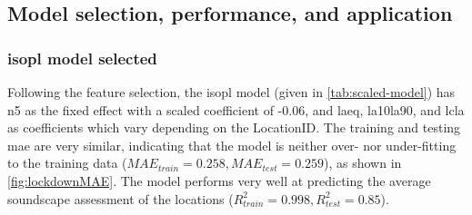  \subsection{Model selection, performance, and application}

\subsubsection{\gls{isopl} model selected}
   Following the feature selection, the \gls{isopl} model (given in \cref{tab:scaled-model}) has \gls{n5} as the fixed effect with a scaled coefficient of -0.06, and \gls{laeq}, \gls{la10la90}, and \gls{lcla} as coefficients which vary depending on the LocationID. The training and testing \gls{mae} are very similar, indicating that the model is neither over- nor under-fitting to the training data ($MAE_{train}=0.258, MAE_{test}=0.259$), as shown in \cref{fig:lockdownMAE}. The model performs very well at predicting the average soundscape assessment of the locations ($R^2_{train}=0.998, R^2_{test}=0.85$).


